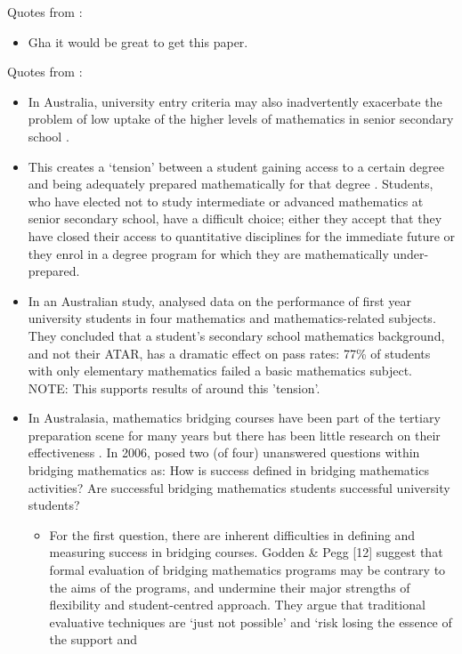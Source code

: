 \documentclass[twoside,12pt,a4paper]{report}
\begin{document}
Quotes from \cite{Nicholas2015}:
\begin{itemize}
	\item Gha it would be great to get this paper.
\end{itemize}

Quotes from \cite{Poladian2013}:
\begin{itemize}
	\item In Australia, university entry criteria may also inadvertently exacerbate the problem
of low uptake of the higher levels of mathematics in senior secondary school \cite{Varsavsky2010}.
	\item This creates a ‘tension’
between a student gaining access to a certain degree and being adequately prepared
mathematically for that degree \cite{Gordon2013b}. Students, who have elected not to study intermediate or
advanced mathematics at senior secondary school, have a difficult choice; either they accept
that they have closed their access to quantitative disciplines for the immediate future or they
enrol in a degree program for which they are mathematically under-prepared.
	\item In an Australian study, \cite{Rylands2009} analysed data on the performance of first year university students in four
mathematics and mathematics-related subjects. They concluded that a student’s secondary
school mathematics background, and not their ATAR, has a dramatic effect on pass rates:
77\% of students with only elementary mathematics failed a basic mathematics subject. NOTE: This supports results of \cite{Kajander2005} around this 'tension'.
	\item In Australasia, mathematics bridging courses have been part of the tertiary
preparation scene for many years but there has been little research on their effectiveness \cite{Rylands2009, MacGillivray2009, Galligan2008}. In 2006, \cite{Galligan2008} posed two (of four) unanswered questions within
bridging mathematics as:
How is success defined in bridging mathematics activities?
Are successful bridging mathematics students successful university students?
	\begin{itemize}
		\item For the first question, there are inherent difficulties in defining and measuring success
in bridging courses. Godden \& Pegg [12] suggest that formal evaluation of bridging
mathematics programs may be contrary to the aims of the programs, and undermine their
major strengths of flexibility and student-centred approach. They argue that traditional
evaluative techniques are ‘just not possible’ and ‘risk losing the essence of the support and

\end{itemize}
\end{itemize}
\end{document}
